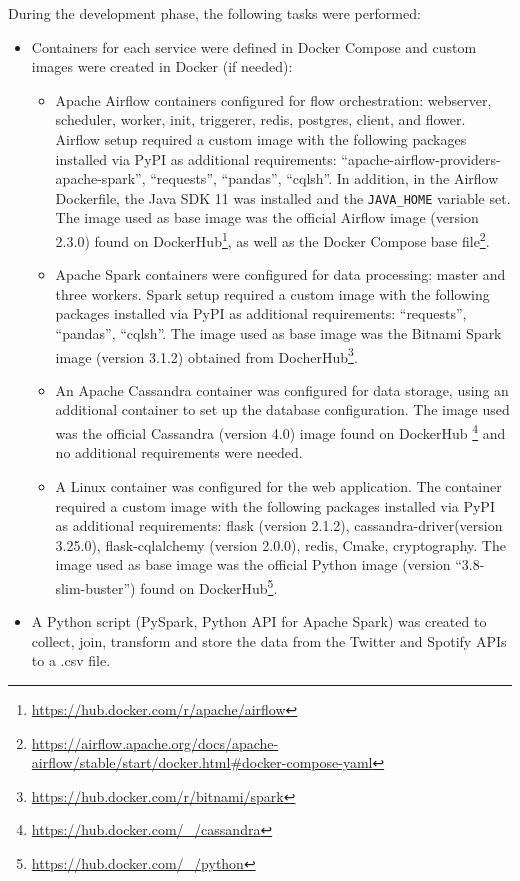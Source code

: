 \nonzeroparskip During the development phase, the following tasks were performed:
\begin{itemize}
	\item Containers for each service were defined in Docker Compose and custom images were created in Docker (if needed):
	\begin{itemize}
		\item Apache Airflow containers configured for flow orchestration: webserver, scheduler, worker, init, triggerer, redis, postgres, client, and flower. Airflow setup required a custom image with the following packages installed via PyPI as additional requirements: ``apache-airflow-providers-apache-spark'', ``requests'', ``pandas'', ``cqlsh''. In addition, in the Airflow Dockerfile, the Java SDK 11 was installed and the \texttt{JAVA\_HOME} variable set. The image used as base image was the official Airflow image (version 2.3.0) found on DockerHub\footnote{\url{https://hub.docker.com/r/apache/airflow}}, as well as the Docker Compose base file\footnote{\url{https://airflow.apache.org/docs/apache-airflow/stable/start/docker.html\#docker-compose-yaml}}.
		\item Apache Spark containers were configured for data processing: master and three workers. Spark setup required a custom image with the following packages installed via PyPI as additional requirements: ``requests'', ``pandas'', ``cqlsh''. The image used as base image was the Bitnami Spark image (version 3.1.2) obtained from DocherHub\footnote{\url{https://hub.docker.com/r/bitnami/spark}}.
		\item An Apache Cassandra container was configured for data storage, using an additional container to set up the database configuration. The image used was the official Cassandra (version 4.0) image found on DockerHub \footnote{\url{https://hub.docker.com/_/cassandra}} and no additional requirements were needed.
		\item A Linux container was configured for the web application. The container required a custom image with the following packages installed via PyPI as additional requirements: flask (version 2.1.2), cassandra-driver(version 3.25.0), flask-cqlalchemy (version 2.0.0), redis, Cmake, cryptography. The image used as base image was the official Python image (version ``3.8-slim-buster'') found on DockerHub\footnote{\url{https://hub.docker.com/_/python}}.
	\end{itemize}
	\item A Python script (PySpark, Python API for Apache Spark) was created to collect, join, transform and store the data from the Twitter and Spotify APIs to a .csv file.

\end{itemize}

